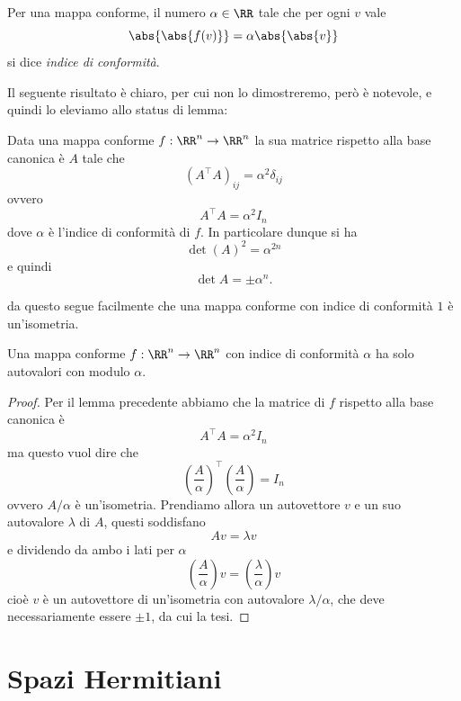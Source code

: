 \documentclass[11pt]{scrartcl}
\begin{document}
   	 \begin{definition}
   	 	Per una mappa conforme, il numero $\alpha\in\RR$ tale che per ogni $v$ vale
   	 	$$\abs{\abs{f(v)}}=\alpha \abs{\abs{v}}$$
   	 	si dice \textit{indice di conformità}.
   	 \end{definition}
   	 Il seguente risultato è chiaro, per cui non lo dimostreremo, però è notevole, e quindi lo eleviamo allo status di lemma:
   	 \begin{lemma}
   	 	Data una mappa conforme $f:\RR^n\to\RR^n$ la sua matrice rispetto alla base canonica è $A$ tale che
   	 	$$\left(A^\intercal A\right)_{ij} =\alpha^2\delta_{ij}$$
   	 	ovvero
   	 	$$A^\intercal A = \alpha^2 I_n$$
   	 	dove $\alpha$ è l'indice di conformità di $f$. In particolare dunque si ha
   	 	$$\det(A)^2=\alpha^{2n}$$
   	 	e quindi
   	 	$$\det A = \pm \alpha^n.$$
   	 \end{lemma}
   	 da questo segue facilmente che una mappa conforme con indice di conformità $1$ è un'isometria.
   	 
   	 \begin{lemma}
   	 	Una mappa conforme $f:\RR^n\to\RR^n$ con indice di conformità $\alpha$ ha solo autovalori con modulo $\alpha$.
   	 \end{lemma}
   	 \begin{proof}
   	 	Per il lemma precedente abbiamo che la matrice di $f$ rispetto alla base canonica è
   	 	$$A^\intercal A = \alpha^2I_n$$
   	 	ma questo vuol dire che
   	 	$$\left(\frac{A}{\alpha}\right)^\intercal\left(\frac{A}{\alpha}\right)=I_n$$
   	 	ovvero $A/\alpha$ è un'isometria. Prendiamo allora un autovettore $v$ e un suo autovalore $\lambda$ di $A$, questi soddisfano
   	 	$$Av=\lambda v$$
   	 	e dividendo da ambo i lati per $\alpha$ 
   	 	$$\left(\frac{A}{\alpha}\right)v=\left(\frac{\lambda}{\alpha}\right)v$$
   	 	cioè $v$ è un autovettore di un'isometria con autovalore $\lambda/\alpha$, che deve necessariamente essere $\pm 1$, da cui la tesi.
   	 \end{proof}
   	 \newpage
   	 
   	 \section{Spazi Hermitiani}
   	 
\end{document}
